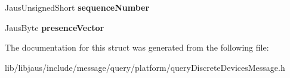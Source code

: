 \begin{DoxyCompactItemize}
\item 
\hypertarget{struct_query_discrete_devices_message_struct_a3988340f5da023e4b47a468709a1cc71}{\-Jaus\-Unsigned\-Short {\bfseries sequence\-Number}}\label{struct_query_discrete_devices_message_struct_a3988340f5da023e4b47a468709a1cc71}

\item 
\hypertarget{struct_query_discrete_devices_message_struct_a7712d8fa1451415b3d1bd15ae30372a0}{\-Jaus\-Byte {\bfseries presence\-Vector}}\label{struct_query_discrete_devices_message_struct_a7712d8fa1451415b3d1bd15ae30372a0}

\end{DoxyCompactItemize}


\-The documentation for this struct was generated from the following file\-:\begin{DoxyCompactItemize}
\item 
lib/libjaus/include/message/query/platform/query\-Discrete\-Devices\-Message.\-h\end{DoxyCompactItemize}
